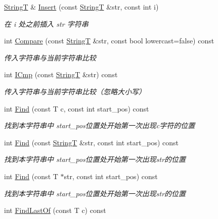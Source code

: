 \begin{DoxyCompactItemize}
\hyperlink{class_util_1_1_string_t}{String\-T} \& \hyperlink{class_util_1_1_string_t_a643a72c0f360c781ad27f0c1aaa9ce84}{Insert} (const \hyperlink{class_util_1_1_string_t}{String\-T} \&str, const int i)
\begin{DoxyCompactList}\small\item\em 在 i 处之前插入 str 字符串 \end{DoxyCompactList}\item 
int \hyperlink{class_util_1_1_string_t_ac5aba7f0da8bd71c812c3a609ccf4840}{Compare} (const \hyperlink{class_util_1_1_string_t}{String\-T} \&str, const bool lowercast=false) const 
\begin{DoxyCompactList}\small\item\em 传入字符串与当前字符串比较 \end{DoxyCompactList}\item 
int \hyperlink{class_util_1_1_string_t_a0f8cc8e5867626a77cb749f6d31ffd35}{I\-Cmp} (const \hyperlink{class_util_1_1_string_t}{String\-T} \&str) const 
\begin{DoxyCompactList}\small\item\em 传入字符串与当前字符串比较（忽略大小写） \end{DoxyCompactList}\item 
int \hyperlink{class_util_1_1_string_t_a5ddc1b3c72bdfead4faaef7f21e149d5}{Find} (const T c, const int start\-\_\-pos) const 
\begin{DoxyCompactList}\small\item\em 找到本字符串中 start\-\_\-pos位置处开始第一次出现c字符的位置 \end{DoxyCompactList}\item 
int \hyperlink{class_util_1_1_string_t_a4b4ab085c3036bfb30f787f39972cd00}{Find} (const \hyperlink{class_util_1_1_string_t}{String\-T} \&str, const int start\-\_\-pos) const 
\begin{DoxyCompactList}\small\item\em 找到本字符串中 start\-\_\-pos位置处开始第一次出现str的位置 \end{DoxyCompactList}\item 
int \hyperlink{class_util_1_1_string_t_a085171caf883c6be96a8f34133db3167}{Find} (const T $\ast$str, const int start\-\_\-pos) const 
\begin{DoxyCompactList}\small\item\em 找到本字符串中 start\-\_\-pos位置处开始第一次出现str的位置 \end{DoxyCompactList}\item 
int \hyperlink{class_util_1_1_string_t_acdb6336dc0e2538fdd2b4d35806aaffe}{Find\-Last\-Of} (const T c) const 

\end{DoxyCompactItemize}
